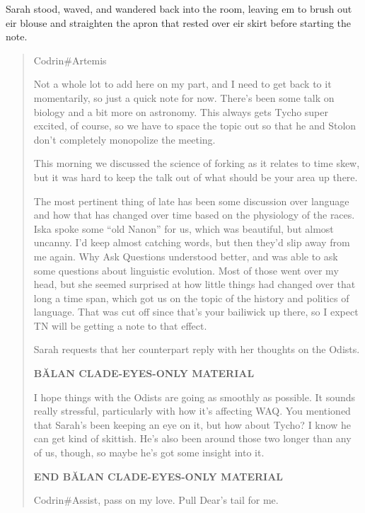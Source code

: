 Sarah stood, waved, and wandered back into the room, leaving em to brush out eir blouse and straighten the apron that rested over eir skirt before starting the note.

\begin{quote}
Codrin\#Artemis

Not a whole lot to add here on my part, and I need to get back to it momentarily, so just a quick note for now. There's been some talk on biology and a bit more on astronomy. This always gets Tycho super excited, of course, so we have to space the topic out so that he and Stolon don't completely monopolize the meeting.

This morning we discussed the science of forking as it relates to time skew, but it was hard to keep the talk out of what should be your area up there.

The most pertinent thing of late has been some discussion over language and how that has changed over time based on the physiology of the races. Iska spoke some ``old Nanon'' for us, which was beautiful, but almost uncanny. I'd keep almost catching words, but then they'd slip away from me again. Why Ask Questions understood better, and was able to ask some questions about linguistic evolution. Most of those went over my head, but she seemed surprised at how little things had changed over that long a time span, which got us on the topic of the history and politics of language. That was cut off since that's your bailiwick up there, so I expect TN will be getting a note to that effect.

Sarah requests that her counterpart reply with her thoughts on the Odists.

\begin{center}
\textbf{BĂLAN CLADE-EYES-ONLY MATERIAL}
\end{center}

I hope things with the Odists are going as smoothly as possible. It sounds really stressful, particularly with how it's affecting WAQ. You mentioned that Sarah's been keeping an eye on it, but how about Tycho? I know he can get kind of skittish. He's also been around those two longer than any of us, though, so maybe he's got some insight into it.

\begin{center}
\textbf{END BĂLAN CLADE-EYES-ONLY MATERIAL}
\end{center}

Codrin\#Assist, pass on my love. Pull Dear's tail for me.
\end{quote}
